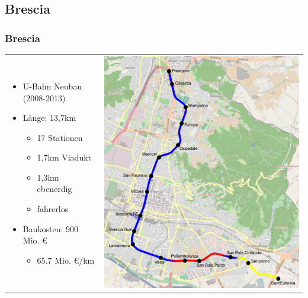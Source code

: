\documentclass[xcolor=dvipsnames]{beamer}
\begin{document}
\subsection{Brescia}
\begin{frame}
  \frametitle{Brescia}

  \begin{tabular}{lc}
    \begin{minipage}{.45\linewidth}
      \begin{itemize}
      \item U-Bahn Neubau (2008-2013)
      \item Länge: 13,7km
        \begin{itemize}
        \item 17 Stationen
        \item 1,7km Viadukt
        \item 1,3km ebenerdig
        \item fahrerlos
        \end{itemize}
      \item Baukosten: 900 Mio. €
        \begin{itemize}
        \item 65.7 Mio. €/km
        \end{itemize}
      \end{itemize}
    \end{minipage}
    &
    \begin{minipage}{.55\linewidth}
      \includegraphics[height=.8\textheight]{data/Brescia.png}
    \end{minipage}
  \end{tabular}
\end{frame}
\end{document}
